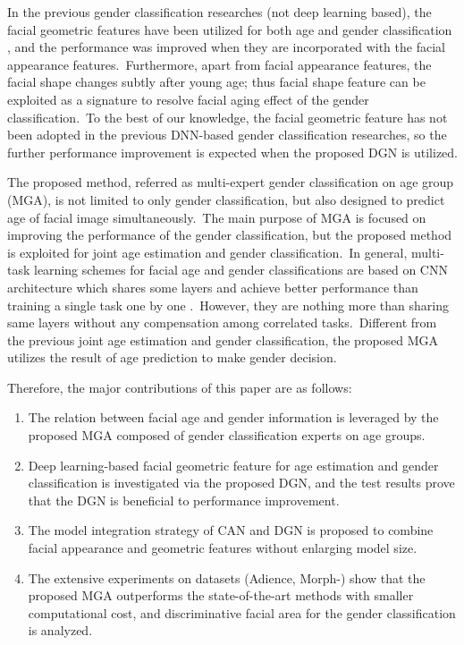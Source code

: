 \documentclass[10pt,twocolumn,letterpaper]{article}
\begin{document}
In the previous gender classification researches (not deep learning based), the facial geometric features have been utilized for both age and gender classification \cite{Ferrario1993, Makinen2008, Samal2007, Xu2008}, and the performance was improved when they are incorporated with the facial appearance features.~Furthermore, apart from facial appearance features, the facial shape changes subtly after young age; thus facial shape feature can be exploited as a signature to resolve facial aging effect of the gender classification.~To the best of our knowledge, the facial geometric feature has not been adopted in the previous DNN-based gender classification researches, so the further performance improvement is expected when the proposed DGN is utilized.

The proposed method, referred as multi-expert gender classification on age group (MGA), is not limited to only gender classification, but also designed to predict age of facial image simultaneously.~The main purpose of MGA is focused on improving the performance of the gender classification, but the proposed method is exploited for joint age estimation and gender classification.~In general, multi-task learning schemes for facial age and gender classifications are based on CNN architecture which shares some layers and achieve better performance than training a single task one by one \cite{Han2018, Zhu2016}.~However, they are nothing more than sharing same layers without any compensation among correlated tasks.~Different from the previous joint age estimation and gender classification, the proposed MGA utilizes the result of age prediction to make gender decision.

Therefore, the major contributions of this paper are as follows:
\begin{enumerate}
    \item The relation between facial age and gender information is leveraged by the proposed MGA composed of gender classification experts on age groups.
    \item Deep learning-based facial geometric feature for age estimation and gender classification is investigated via the proposed DGN, and the test results prove that the DGN is beneficial to performance improvement.
    \item The model integration strategy of CAN and DGN is proposed to combine facial appearance and geometric features without enlarging model size. 
    \item The extensive experiments on datasets (Adience, Morph-) show that the proposed MGA outperforms the state-of-the-art methods with smaller computational cost, and discriminative facial area for the gender classification is analyzed.
\end{enumerate}
\end{document}
